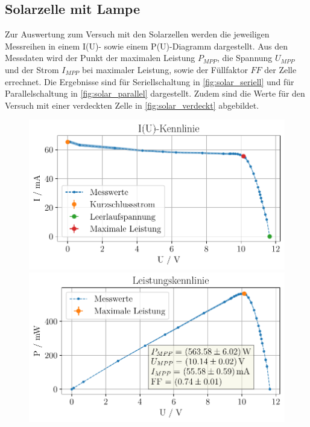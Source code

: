\documentclass[english, ngerman]{scrartcl}
\begin{document}
\subsection{Solarzelle mit Lampe}
\label{subsec:auswertung_solar_lampe}
Zur Auswertung zum Versuch mit den Solarzellen werden die jeweiligen Messreihen in einem I(U)- sowie einem P(U)-Diagramm dargestellt. Aus den Messdaten wird der Punkt der maximalen Leistung $P_{MPP}$, die Spannung $U_{MPP}$ und der Strom $I_{MPP}$ bei maximaler Leistung, sowie der Füllfaktor $FF$ der Zelle errechnet. Die Ergebnisse sind für Seriellschaltung in \autoref{fig:solar_seriell} und für Parallelschaltung in \autoref{fig:solar_parallel} dargestellt. Zudem sind die Werte für den Versuch mit einer verdeckten Zelle in \autoref{fig:solar_verdeckt} abgebildet.
\setcapindent{0pt}
\begin{figure}[H]
    \centering
    \begin{minipage}[t]{0.485\linewidth}
        \centering
        \includegraphics[width=\linewidth]{fig/plots/solar_seriell_UI_.pdf}
    \end{minipage}%
    \hspace*{\fill}
    \begin{minipage}[t]{0.485\linewidth}
        \centering
        \includegraphics[width=\linewidth]{fig/plots/solar_seriell_UP_.pdf}

\end{minipage}
\end{figure}
\end{document}
